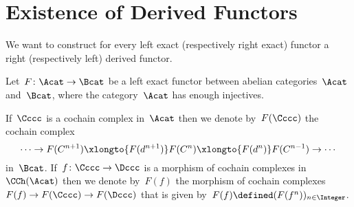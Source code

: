 \section{Existence of Derived Functors}


\begin{goalnonum}
  We want to construct for every left exact (respectively right exact) functor a right (respectively left) derived functor.
\end{goalnonum}


\begin{conventionnonum}
  Let~$F \colon \Acat \to \Bcat$ be a left exact functor between abelian categories~$\Acat$ and~$\Bcat$, where the category~$\Acat$ has enough injectives.
\end{conventionnonum}


\begin{notation*}
  If~$\Cccc$ is a cochain complex in~$\Acat$ then we denote by~$F(\Cccc)$ the cochain complex
  \[
    \dotsb
    \to
    F(C^{n+1})
    \xlongto{F(d^{n+1})}
    F(C^n)
    \xlongto{F(d^n)}
    F(C^{n-1})
    \to
    \dotsb
  \]
  in~$\Bcat$.
  If~$f \colon \Cccc \to \Dccc$ is a morphism of cochain complexes in~$\CCh(\Acat)$ then we denote by~$F(f)$ the morphism of cochain complexes~$F(f) \to F(\Cccc) \to F(\Dccc)$ that is given by~$F(f) \defined (F(f^n))_{n \in \Integer}$.
\end{notation*}


